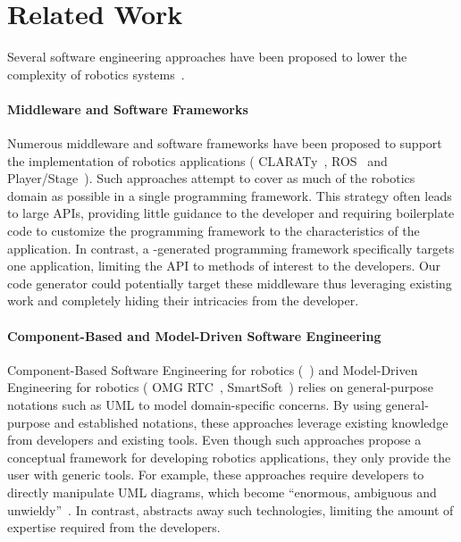
\section{Related Work}
\label{sec:related}

Several software engineering approaches have been proposed to lower
the complexity of robotics systems~\cite{Brug07a}.

\paragraph*{Middleware and Software Frameworks}

Numerous middleware and software frameworks have been proposed to
support the implementation of robotics applications (\eg{}
CLARATy~\cite{Claraty}, ROS~\cite{ROS} and
Player/Stage~\cite{Coll05a}). Such approaches attempt to cover as much
of the robotics domain as possible in a single programming framework.
This strategy often leads to large APIs, providing little guidance to
the developer and requiring boilerplate code to customize the
programming framework to the characteristics of the application. In
contrast, a \diaspec{}-generated programming framework specifically
targets one application, limiting the API to methods of interest to
the developers. Our code generator could potentially target these
middleware thus leveraging existing work and completely hiding their
intricacies from the developer.

\paragraph*{Component-Based and Model-Driven Software Engineering}

Component-Based Software Engineering for robotics
(\eg{}~\cite{Brug07b}) and Model-Driven Engineering for robotics
(\eg{} OMG RTC~\cite{OMGRTC}, SmartSoft~\cite{Schl09a}) relies on
general-purpose notations such as UML to model domain-specific
concerns. By using general-purpose and established notations, these
approaches leverage existing knowledge from developers and existing
tools. Even though such approaches propose a conceptual framework for
developing robotics applications, they only provide the user with
generic tools. For example, these approaches require developers to
directly manipulate UML diagrams, which become ``enormous, ambiguous
and unwieldy''~\cite{Picek08a}. In contrast, \diaspec{} abstracts away
such technologies, limiting the amount of expertise required from the
developers.

